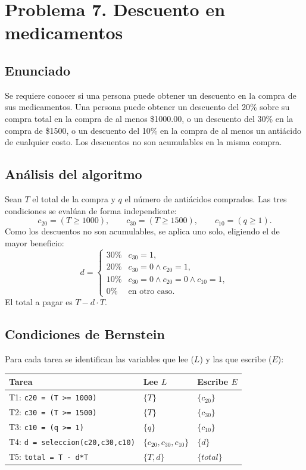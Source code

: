 \section{Problema 7. Descuento en medicamentos}

\subsection*{Enunciado}
Se requiere conocer si una persona puede obtener un descuento en la compra de
sus medicamentos. Una persona puede obtener un descuento del 20\% sobre su
compra total en la compra de al menos \$1000.00, o un descuento del 30\% en la
compra de \$1500, o un descuento del 10\% en la compra de al menos un
anti\'acido de cualquier costo. Los descuentos no son acumulables en la misma
compra.

\subsection*{An\'alisis del algoritmo}
Sean $T$ el total de la compra y $q$ el n\'umero de anti\'acidos comprados. Las
tres condiciones se eval\'uan de forma independiente:
\[
    c_{20} = (T \ge 1000), \qquad
    c_{30} = (T \ge 1500), \qquad
    c_{10} = (q \ge 1).
\]
Como los descuentos no son acumulables, se aplica uno solo, eligiendo el de
mayor beneficio:
\[
    d =
    \begin{cases}
        30\% & c_{30} = 1, \\
        20\% & c_{30} = 0 \wedge c_{20} = 1, \\
        10\% & c_{30} = 0 \wedge c_{20} = 0 \wedge c_{10} = 1, \\
        0\%  & \text{en otro caso}.
    \end{cases}
\]
El total a pagar es $T - d \cdot T$.

\subsection*{Condiciones de Bernstein}
Para cada tarea se identifican las variables que lee ($L$) y las que escribe
($E$):

\begin{center}
\begin{tabular}{lll}
\toprule
Tarea & Lee $L$ & Escribe $E$ \\
\midrule
T1: \texttt{c20 = (T >= 1000)}          & $\{T\}$           & $\{c_{20}\}$ \\
T2: \texttt{c30 = (T >= 1500)}          & $\{T\}$           & $\{c_{30}\}$ \\
T3: \texttt{c10 = (q >= 1)}             & $\{q\}$           & $\{c_{10}\}$ \\
T4: \texttt{d = seleccion(c20,c30,c10)} & $\{c_{20},c_{30},c_{10}\}$ & $\{d\}$ \\
T5: \texttt{total = T - d*T}            & $\{T,d\}$         & $\{total\}$ \\
\bottomrule
\end{tabular}
\end{center}

